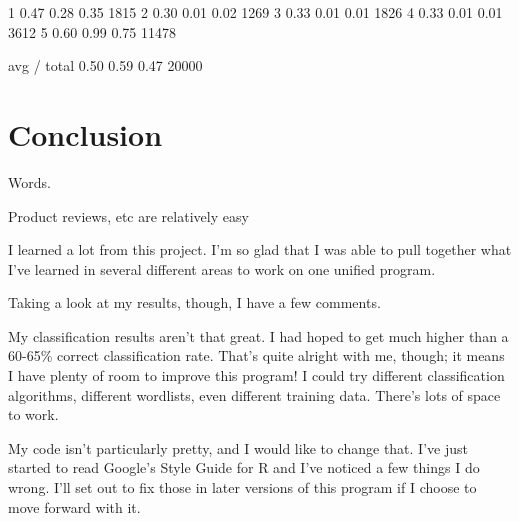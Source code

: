 \documentclass[12pt]{report}
\begin{document}
1       0.47      0.28      0.35      1815
2       0.30      0.01      0.02      1269
3       0.33      0.01      0.01      1826
4       0.33      0.01      0.01      3612
5       0.60      0.99      0.75     11478

avg / total       0.50      0.59      0.47     20000

\newpage

\chapter*{Conclusion}

Words.

Product reviews, etc are relatively easy

I learned a lot from this project. I’m so glad that I was able to pull together what I’ve learned in several different areas to work on one unified program.

Taking a look at my results, though, I have a few comments.

My classification results aren’t that great. I had hoped to get much higher than a 60-65\% correct classification rate. That’s quite alright with me, though; it means I have plenty of room to improve this program! I could try different classification algorithms, different wordlists, even different training data. There’s lots of space to work.

My code isn’t particularly pretty, and I would like to change that. I’ve just started to read Google’s Style Guide for R and I’ve noticed a few things I do wrong. I’ll set out to fix those in later versions of this program if I choose to move forward with it.

\newpage

\end{document}
